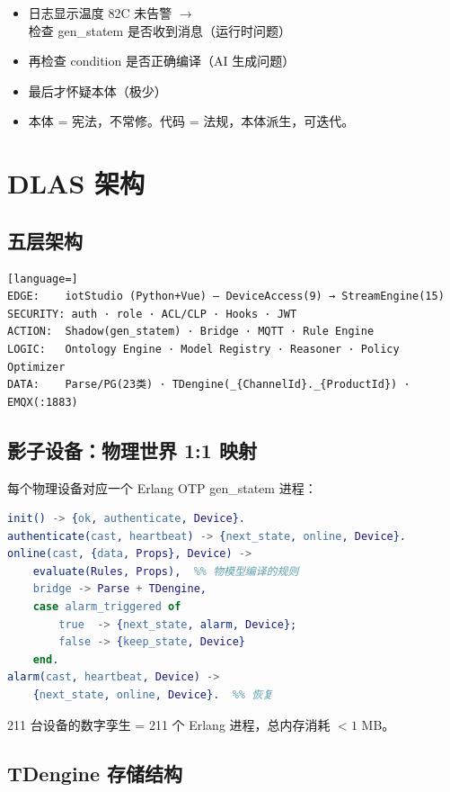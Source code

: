 \documentclass[12pt,a4paper]{ctexart}
\begin{document}
\begin{itemize}[leftmargin=*]
  \item 日志显示温度 82\textdegree C 未告警 $\rightarrow$ 检查 gen\_statem 是否收到消息（运行时问题）
  \item 再检查 condition 是否正确编译（AI 生成问题）
  \item 最后才怀疑本体（极少）
  \item 本体 = 宪法，不常修。代码 = 法规，本体派生，可迭代。
\end{itemize}

\section{DLAS 架构}

\subsection{五层架构}

\begin{lstlisting}[language=]
EDGE:    iotStudio (Python+Vue) — DeviceAccess(9) → StreamEngine(15)
SECURITY: auth · role · ACL/CLP · Hooks · JWT
ACTION:  Shadow(gen_statem) · Bridge · MQTT · Rule Engine
LOGIC:   Ontology Engine · Model Registry · Reasoner · Policy Optimizer
DATA:    Parse/PG(23类) · TDengine(_{ChannelId}._{ProductId}) · EMQX(:1883)
\end{lstlisting}

\subsection{影子设备：物理世界 1:1 映射}

每个物理设备对应一个 Erlang OTP gen\_statem 进程：

\begin{lstlisting}[language=erlang]
init() -> {ok, authenticate, Device}.
authenticate(cast, heartbeat) -> {next_state, online, Device}.
online(cast, {data, Props}, Device) ->
    evaluate(Rules, Props),  %% 物模型编译的规则
    bridge -> Parse + TDengine,
    case alarm_triggered of
        true  -> {next_state, alarm, Device};
        false -> {keep_state, Device}
    end.
alarm(cast, heartbeat, Device) ->
    {next_state, online, Device}.  %% 恢复
\end{lstlisting}

211 台设备的数字孪生 = 211 个 Erlang 进程，总内存消耗 $< 1$ MB。

\subsection{TDengine 存储结构}
\end{document}
